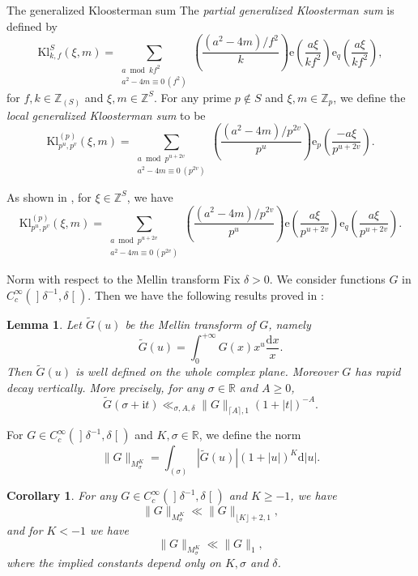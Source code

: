 \documentclass[10pt,oneside,reqno]{amsart}
\makeatletter
\newcommand\lopen{\mathopen{]}}
\newcommand\ropen{\mathclose{[}}
\newcommand\rmd{\mathrm{d}}
\newcommand\rme{\mathrm{e}}
\newcommand\rmi{\mathrm{i}}
\newcommand\RR{\mathbb{R}}
\newcommand\ZZ{\mathbb{Z}}
\newcommand\Kl{\mathrm{Kl}}
\renewcommand\geq{\geqslant}
\newcommand\legendresymbol[2]{\genfrac{(}{)}{}{}{#1}{#2}}
\def\subsection{\@startsection{subsection}{2}%
  \z@{3pt\@plus0pt}{-.5em}%
  {\normalfont\bfseries}}
\theoremstyle{THEOREM}
\newtheorem{lemma}[theorem]{Lemma}
\newtheorem{corollary}[theorem]{Corollary}
\theoremstyle{DEFINITION}
\theoremstyle{EXERCISE}
\numberwithin{equation}{section}
\makeatother
\begin{document}
\subsection{The generalized Kloosterman sum} The \emph{partial generalized Kloosterman sum} is defined by
\[
\Kl_{k,f}^S(\xi,m)=
  \sum_{\substack{a \bmod kf^2\\ a^2-4m\equiv 0\,(f^2)}}\legendresymbol{(a^2-4m)/f^2}{k}\rme\legendresymbol{a\xi}{kf^2}\rme_{q}\legendresymbol{a\xi}{kf^2},
\]
for $f,k\in \ZZ_{(S)}$ and $\xi,m\in \ZZ^S$. 
For any prime $p\notin S$ and $\xi,m\in \ZZ_p$, we define the \emph{local generalized Kloosterman sum} to be
\begin{equation}\label{eq:localgeneralizedkloosterman}
\Kl_{p^u,p^v}^{(p)}(\xi,m)=
\sum_{\substack{a \bmod p^{u+2v}\\ a^2-4m\equiv 0\,(p^{2v})}}\legendresymbol{(a^2-4m)/p^{2v}}{p^u}\rme_p\legendresymbol{-a\xi}{p^{u+2v}}.
\end{equation}

As shown in \cite[Section 2.6]{cheng2025b}, for $\xi\in \ZZ^S$, we have
\begin{equation}\label{eq:localgeneralizedkloostermaneq}
\Kl_{p^u,p^v}^{(p)}(\xi,m)=
\sum_{\substack{a \bmod p^{u+2v}\\ a^2-4m\equiv 0\,(p^{2v})}}\legendresymbol{(a^2-4m)/p^{2v}}{p^u} \rme\legendresymbol{a\xi}{p^{u+2v}}\rme_{q}\legendresymbol{a\xi}{p^{u+2v}}.
\end{equation}

\subsection{Norm with respect to the Mellin transform} Fix $\delta>0$. We consider functions $G$ in $C_c^\infty(\lopen \delta^{-1},\delta\ropen)$. Then we have the following results proved in \cite{cheng2025c}:

\begin{lemma}\label{lem:grapiddeacy}
Let $\widetilde{G}(u)$ be the Mellin transform of $G$, namely
\[
\widetilde{G}(u)=\int_{0}^{+\infty}G(x)x^{u}\frac{\rmd x}{x}.
\]
Then $\widetilde{G}(u)$ is well defined on the whole complex plane. Moreover $G$ has rapid decay vertically. More precisely, for any $\sigma\in \RR$ and $A\geq 0$,
\[
\widetilde{G}(\sigma+\rmi t)\ll_{\sigma,A,\delta}\|G\|_{\lceil A\rceil,1}(1+|t|)^{-A}.
\]
\end{lemma}

For $G\in C_c^\infty(\lopen\delta^{-1},\delta\ropen)$ and $K,\sigma\in \RR$, we define the norm
\[
\|G\|_{M^K_\sigma}=\int_{(\sigma)}|\widetilde{G}(u)|(1+|u|)^{K}\rmd |u|.
\]
\begin{corollary}\label{cor:mellinnorm}
For any $G\in C_c^\infty(\lopen\delta^{-1},\delta\ropen)$ and $K\geq -1$, we have
\[
\|G\|_{M^K_\sigma}\ll \|G\|_{\lfloor K\rfloor +2,1},
\]
and for $K<-1$ we have
\[
\|G\|_{M^K_\sigma}\ll \|G\|_{1},
\]
where the implied constants depend only on $K,\sigma$ and $\delta$.
\end{corollary}
\end{document}
